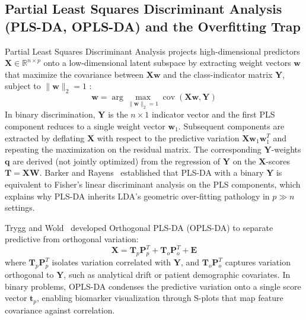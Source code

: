 \documentclass[11pt,oneside]{book}
\begin{document}
\clearpage

\subsection{Partial Least Squares Discriminant Analysis (PLS-DA, OPLS-DA) and the Overfitting Trap}

Partial Least Squares Discriminant Analysis projects high-dimensional predictors $\mathbf{X} \in \mathbb{R}^{n \times p}$ onto a low-dimensional latent subspace by extracting weight vectors $\mathbf{w}$ that maximize the covariance between $\mathbf{X}\mathbf{w}$ and the class-indicator matrix $\mathbf{Y}$, subject to $\|\mathbf{w}\|_2 = 1$ \cite{barker2003partial}:
\begin{equation}
\label{eq:plsda_objective}
\mathbf{w} = \arg\max_{\|\mathbf{w}\|_2 = 1} \operatorname{cov}(\mathbf{X}\mathbf{w}, \mathbf{Y})
\end{equation}
In binary discrimination, $\mathbf{Y}$ is the $n \times 1$ indicator vector and the first PLS component reduces to a single weight vector $\mathbf{w}_1$. Subsequent components are extracted by deflating $\mathbf{X}$ with respect to the predictive variation $\mathbf{X}\mathbf{w}_1\mathbf{w}_1^T$ and repeating the maximization on the residual matrix. The corresponding $\mathbf{Y}$-weights $\mathbf{q}$ are derived (not jointly optimized) from the regression of $\mathbf{Y}$ on the $\mathbf{X}$-scores $\mathbf{T} = \mathbf{X}\mathbf{W}$. Barker and Rayens~\cite{barker2003partial} established that PLS-DA with a binary $\mathbf{Y}$ is equivalent to Fisher's linear discriminant analysis on the PLS components, which explains why PLS-DA inherits LDA's geometric over-fitting pathology in $p \gg n$ settings.

Trygg and Wold~\cite{trygg2002orthogonal} developed Orthogonal PLS-DA (OPLS-DA) to separate predictive from orthogonal variation:
\begin{equation}
\mathbf{X} = \mathbf{T}_p \mathbf{P}_p^T + \mathbf{T}_o \mathbf{P}_o^T + \mathbf{E}
\end{equation}
where $\mathbf{T}_p \mathbf{P}_p^T$ isolates variation correlated with $\mathbf{Y}$, and $\mathbf{T}_o \mathbf{P}_o^T$ captures variation orthogonal to $\mathbf{Y}$, such as analytical drift or patient demographic covariates. In binary problems, OPLS-DA condenses the predictive variation onto a single score vector $\mathbf{t}_p$, enabling biomarker visualization through S-plots that map feature covariance against correlation.
\end{document}
